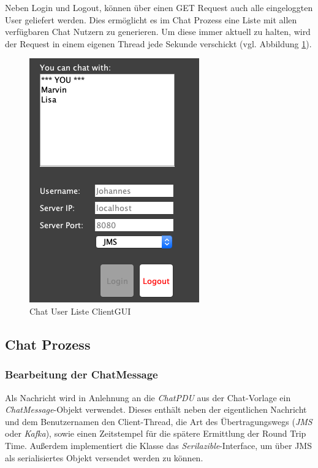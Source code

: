 \documentclass[10pt,journal,compsoc]{IEEEtran}
\begin{document}
Neben Login und Logout, können über einen GET Request auch alle eingeloggten User geliefert werden. Dies ermöglicht es im Chat Prozess eine Liste mit allen verfügbaren Chat Nutzern zu generieren. Um diese immer aktuell zu halten, wird der Request in einem eigenen Thread jede Sekunde verschickt (vgl. Abbildung \ref{fig:chatusers}).

\begin{figure}[h]
	\centering
	\includegraphics[scale=0.35]{Bilder/Chatusers.PNG}
	\caption{Chat User Liste ClientGUI}
	\label{fig:chatusers}
\end{figure}


\subsection{Chat Prozess}
\label{chatprozess}

\subsubsection{Bearbeitung der ChatMessage}
Als Nachricht wird in Anlehnung an die \textit{ChatPDU} aus der Chat-Vorlage ein \textit{ChatMessage}-Objekt verwendet. Dieses enthält neben der eigentlichen Nachricht und dem Benutzernamen den Client-Thread, die Art des Übertragungswegs (\textit{JMS} oder \textit{Kafka}), sowie einen Zeitstempel für die spätere Ermittlung der Round Trip Time.
Außerdem implementiert die Klasse das \textit{Serilazible}-Interface, um über JMS als serialisiertes Objekt versendet werden zu können.
\end{document}
